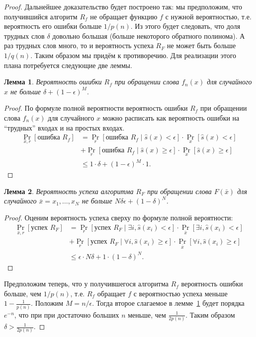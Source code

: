 \documentclass[12pt,a4paper]{article}
\theoremstyle{definition}
\theoremstyle{plain}
\newtheorem{lemma}{Лемма}[section]
\theoremstyle{remark}
\begin{document}
\begin{proof}
Дальнейшее доказательство будет построено так: мы предположим, что получившийся алгоритм $R_f$ 
не обращает функцию $f$ с нужной вероятностью, т.е. вероятность его ошибки больше $1/p(n)$.
Из этого будет следовать, что доля трудных слов $\delta$ довольно большая 
(больше некоторого обратного полинома). А раз трудных слов много, то и вероятность успеха 
$R_F$ не может быть больше $1/q(n)$. Таким образом мы придём к противоречию.
Для реализации этого плана потребуется следующие две леммы.
\begin{lemma}\label{lm:owf:rf}
Вероятность ошибки $R_f$ при обращении слова $f_n(x)$ 
для случайного $x$ не больше $\delta + (1 - \epsilon)^M.$
\end{lemma}
\begin{proof}
По формуле полной вероятности вероятность ошибки $R_f$ 
при обращении слова $f_n(x)$ для случайного $x$ можно расписать
как вероятность ошибки на ``трудных'' входах и на простых входах.
$$\begin{aligned}
\Pr_{x,r}[\text{ошибка $R_f$}] 
&= \Pr_r[\text{ошибка $R_f$}\mid \hat s(x) <   \epsilon] \cdot \Pr_x[\hat s(x) <   \epsilon]\\ 
&+ \Pr_r[\text{ошибка $R_f$}\mid \hat s(x) \ge \epsilon] \cdot \Pr_x[\hat s(x) \ge \epsilon]\\
&\le 1 \cdot \delta + (1 - \epsilon)^M \cdot 1.
\end{aligned}
$$
\end{proof}

\begin{lemma}\label{lm:owf:rfn}
Вероятность успеха алгоритма $R_F$ при обращении слова $F(\bar x)$ 
для случайного $\bar x = x_1,\dotsc,x_N$ не больше $N\delta\epsilon + (1 - \delta)^N$.
\end{lemma}
\begin{proof}
Оценим вероятность успеха сверху по формуле полной вероятности:
$$\begin{aligned}
\Pr_{\bar x,r}[\text{успех $R_F$}] 
&= \Pr_r[\text{успех $R_F$}\mid \exists i, \hat s(x_i) <   \epsilon] \cdot \Pr_{\bar x}[\exists i, \hat s(x_i) < \epsilon]\\
&+ \Pr_r[\text{успех $R_F$}\mid \forall i, \hat s(x_i) \ge \epsilon] \cdot \Pr_{\bar x}[\forall i, \hat s(x_i) \ge \epsilon]\\
&\le \epsilon \cdot N\delta + 1 \cdot (1 - \delta)^N.
\end{aligned}
$$
\end{proof}

Предположим теперь, что у получившегося алгоритма $R_f$ вероятность ошибки больше, чем $1/p(n)$, 
т.е. $R_f$ обращает $f$ с вероятностью успеха меньше $1-\frac{1}{p(n)}$. Положим $M = n / \epsilon$. 
Тогда второе слагаемое в лемме~\ref{lm:owf:rf} будет порядка $e^{-n}$, что при
при достаточно больших $n$ меньше, чем $\frac{1}{2p(n)}$.  Таким образом
$\delta > \frac{1}{2p(n)}$.


\end{proof}
\end{document}
